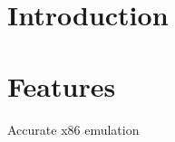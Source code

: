 \hypertarget{gui_1_1tk_i}{}\section{Introduction}\label{gui_1_1tk_i}
\hypertarget{gui_1_1tk_f}{}\section{Features}\label{gui_1_1tk_f}
\begin{DoxyItemize}
\item Accurate x86 emulation \end{DoxyItemize}
